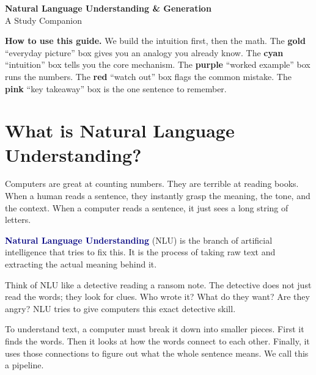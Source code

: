 \documentclass[12pt,a4paper]{article}
\newcommand{\vocab}[1]{\textbf{\textcolor{navy}{#1}}}
\begin{document}
\begin{center}
  {\LARGE\bfseries\sffamily Natural Language Understanding \& Generation} \\[0.5em]
  {\large A Study Companion} \\[1.5em]
\end{center}

\noindent
\textbf{How to use this guide.}
We build the intuition first, then the math. The \textcolor{realFrame}{\textbf{gold}}
``everyday picture'' box gives you an analogy you already know. The
\textcolor{intuFrame}{\textbf{cyan}} ``intuition'' box tells you the core
mechanism. The \textcolor{workFrame}{\textbf{purple}} ``worked example'' box runs
the numbers. The \textcolor{watchFrame}{\textbf{red}} ``watch out'' box flags the
common mistake. The \textcolor{keyFrame}{\textbf{pink}} ``key takeaway'' box
is the one sentence to remember.

\medskip

\section{What is Natural Language Understanding?}

Computers are great at counting numbers. They are terrible at reading books. When a human reads a sentence, they instantly grasp the meaning, the tone, and the context. When a computer reads a sentence, it just sees a long string of letters.

\vocab{Natural Language Understanding} (NLU) is the branch of artificial intelligence that tries to fix this. It is the process of taking raw text and extracting the actual meaning behind it.

\begin{everyday}
Think of NLU like a detective reading a ransom note. The detective does not just read the words; they look for clues. Who wrote it? What do they want? Are they angry? NLU tries to give computers this exact detective skill.
\end{everyday}

\begin{intuition}
To understand text, a computer must break it down into smaller pieces. First it finds the words. Then it looks at how the words connect to each other. Finally, it uses those connections to figure out what the whole sentence means. We call this a pipeline.
\end{intuition}
\end{document}
